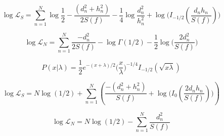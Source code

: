 \begin{equation}
\log \mathcal{L}_{S} = \sum_{n=1}^{N} \log\frac{1}{2} - \frac{(d_{n}^{2} + h_{n}^{2})}{2 S(f)} - \frac{1}{4}\log\frac{d_{n}^{2}}{h_{n}^{2}} + \log\Big(I_{-1/2}(\frac{d_{n} h_{n}}{S(f)})\Big)
\end{equation}

\begin{equation}
\log \mathcal{L}_{N} = \sum_{n=1}^{N} \frac{-d_{n}^{2}}{2S(f)} - \log\Gamma(1/2) - \frac{1}{2}\log\Big(\frac{2 d_{n}^{2}}{S(f)}\Big)
\end{equation}

\begin{equation}
P(x|\lambda) = \frac{1}{2}e^{-(x + \lambda) / 2}\Big(\frac{x}{\lambda}\Big)^{-1/4} I_{-1/2}(\sqrt{x\lambda})
\end{equation}

\begin{equation}
\log \mathcal{L}_{S} = N\log(1/2) + \sum_{n=1}^{N} \left( \frac{-(d_{n}^{2} + h_{n}^{2})}{S(f)} + \log\Big(I_0(\frac{2 d_{n} h_{n}}{S(f)})\Big) \right)
\end{equation}

\begin{equation}
\log \mathcal{L}_{N} = N\log(1/2) - \sum_{n=1}^{N} \frac{d_{n}^{2}}{S(f)}
\end{equation}